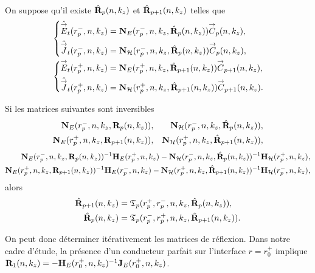     \begin{prop}%
      \label{prop:cylindre:synthese:reflexion}{}~

      On suppose qu'il existe \(\hat{\mathbf{R}}_{p}(n,k_z)\) et \(\hat{\mathbf{R}}_{p+1}(n,k_z)\) telles que 
      \begin{align*}
      &\left\lbrace\begin{aligned}
        \hat{{\overset{\rightarrow}{E}}}_t(r_{p}^-,n,k_z) &= \mathbf{N}_{E}(r_p^-,n,k_z,\hat{\mathbf{R}}_{p}(n,k_z)){\overset{\rightarrow}{C}}_{p}(n,k_z),
        \\
        \hat{{\overset{\rightarrow}{J}}}_t(r_{p}^-,n,k_z) &= \mathbf{N}_{\mathcal{H}}(r_p^-,n,k_z,\hat{\mathbf{R}}_{p}(n,k_z)){\overset{\rightarrow}{C}}_{p}(n,k_z),
        \end{aligned}
      \right.
      \\
      &\left\lbrace\begin{aligned}
        {\overset{\rightarrow}{E}}_t(r_{p}^+,n,k_z) &= \mathbf{N}_{E}(r_p^+,n,k_z,\hat{\mathbf{R}}_{p+1}(n,k_z)){\overset{\rightarrow}{C}}_{p+1}(n,k_z),
        \\
        \hat{{\overset{\rightarrow}{J}}}_t(r_{p}^+,n,k_z) &= \mathbf{N}_{\mathcal{H}}(r_p^+,n,k_z,\hat{\mathbf{R}}_{p+1}(n,k_z)){\overset{\rightarrow}{C}}_{p+1}(n,k_z).
        \end{aligned}
      \right.      
      \end{align*}

      Si les matrices suivantes sont inversibles
      \begin{align*}
        \mathbf{N}_{E}(r_p^-,n,k_z,\mathbf{R}_{p}(n,k_z)), && \mathbf{N}_{\mathcal{H}}(r_p^-,n,k_z,\hat{\mathbf{R}}_{p}(n,k_z)),
        \\
        \mathbf{N}_{E}(r_p^+,n,k_z,\mathbf{R}_{p+1}(n,k_z)), && \mathbf{N}_{\mathcal{H}}(r_p^+,n,k_z,\hat{\mathbf{R}}_{p+1}(n,k_z)),
      \end{align*}
      \begin{align*}
        \mathbf{N}_{E}(r_p^-,n,k_z,\mathbf{R}_{p}(n,k_z))^{-1}\mathbf{H}_{E}(r_p^+,n,k_z) - \mathbf{N}_{\mathcal{H}}(r_p^-,n,k_z,\hat{\mathbf{R}}_{p}(n,k_z))^{-1}\mathbf{H}_{\mathcal{H}}(r_p^+,n,k_z),
        \\
        \mathbf{N}_{E}(r_p^+,n,k_z,\mathbf{R}_{p+1}(n,k_z))^{-1}\mathbf{H}_{E}(r_p^-,n,k_z) - \mathbf{N}_{\mathcal{H}}(r_p^+,n,k_z,\hat{\mathbf{R}}_{p+1}(n,k_z))^{-1}\mathbf{H}_{\mathcal{H}}(r_p^-,n,k_z),
      \end{align*}
      alors
      \begin{align*}
        \hat{\mathbf{R}}_{p+1}(n,k_z) &= \mathfrak{T}_p(r_p^+,r_p^-,n,k_z,\hat{\mathbf{R}}_{p}(n,k_z)),
        \\
        \hat{\mathbf{R}}_{p}(n,k_z) &= \mathfrak{T}_p(r_p^-,r_p^+,n,k_z,\hat{\mathbf{R}}_{p+1}(n,k_z)).
      \end{align*}
    \end{prop}

    On peut donc déterminer itérativement les matrices de réflexion. Dans notre cadre d'étude, la présence d'un conducteur parfait sur l'interface \(r=r_0^+\) implique \(\mathbf{R}_{1}(n,k_z) = -\mathbf{H}_E(r_0^+,n,k_z)^{-1}\mathbf{J}_E(r_0^+,n,k_z)\).


